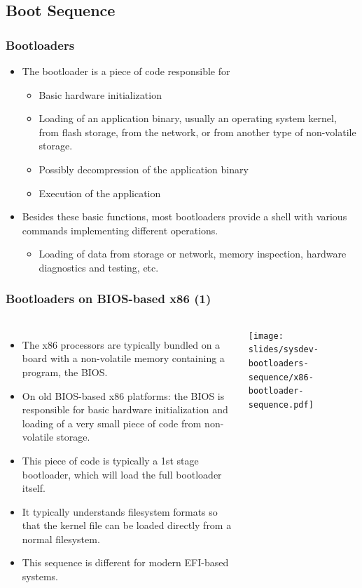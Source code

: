 \subsection{Boot Sequence}
\begin{frame}
  \frametitle{Bootloaders}
  \begin{itemize}
  \item The bootloader is a piece of code responsible for
    \begin{itemize}
    \item Basic hardware initialization
    \item Loading of an application binary, usually an operating
      system kernel, from flash storage, from the network, or from
      another type of non-volatile storage.
    \item Possibly decompression of the application binary
    \item Execution of the application
    \end{itemize}
  \item Besides these basic functions, most bootloaders provide a
    shell with various commands implementing different operations.
    \begin{itemize}
    \item Loading of data from storage or network, memory inspection,
      hardware diagnostics and testing, etc.
    \end{itemize}
  \end{itemize}
\end{frame}

\begin{frame}
  \frametitle{Bootloaders on BIOS-based x86 (1)}
  \begin{columns}
    \begin{itemize}
    \item The x86 processors are typically bundled on a board with a
      non-volatile memory containing a program, the BIOS.
    \item On old BIOS-based x86 platforms: the BIOS is responsible for
      basic hardware initialization and loading of a very small piece
      of code from non-volatile storage.
    \item This piece of code is typically a 1st stage bootloader,
      which will load the full bootloader itself.
    \item It typically understands filesystem formats so that the
      kernel file can be loaded directly from a normal filesystem.
    \item This sequence is different for modern EFI-based systems.
    \end{itemize}
    \texttt{[image: slides/sysdev-bootloaders-sequence/x86-bootloader-sequence.pdf]}
  \end{columns}
\end{frame}

